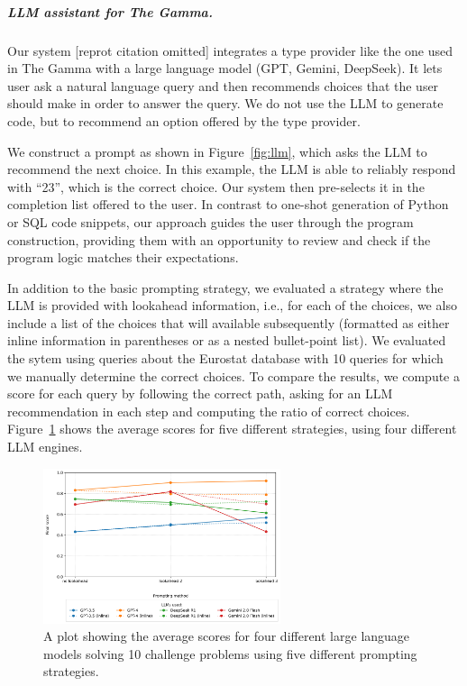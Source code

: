 \documentclass[anonymous, a4paper,UKenglish,cleveref, autoref, thm-restate]{lipics-v2021}
\begin{document}
\subparagraph{LLM assistant for The Gamma.}
Our system [reprot citation omitted] integrates a type provider like the one used in The Gamma
with a large language model (GPT, Gemini, DeepSeek). It lets user ask a natural language query and
then recommends choices that the user should make in order to answer the query. We do not
use the LLM to generate code, but to recommend an option offered by the type provider.

We construct a prompt as shown in Figure~\ref{fig:llm}, which asks the LLM to recommend the next
choice. In this example, the LLM is able to reliably respond with ``23'', which is the correct
choice. Our system then pre-selects it in the completion list offered to the user.
In contrast to one-shot generation of Python or SQL code snippets, our approach guides the user
through the program construction, providing them with an opportunity to review and check if the
program logic matches their expectations.

In addition to the basic prompting strategy, we evaluated a strategy where the LLM
is provided with lookahead information, i.e., for each of the choices, we also include a list of
the choices that will available subsequently (formatted as either inline information in parentheses
or as a nested bullet-point list). We evaluated the sytem using queries about the Eurostat
database with 10 queries for which we manually determine the correct choices. To compare the results,
we compute a score for each query by following the correct path, asking for an LLM recommendation
in each step and computing the ratio of correct choices. Figure~\ref{fig:methods} shows the
average scores for five different strategies, using four different LLM engines.

\begin{figure}[t]
\vspace{-1em}
\includegraphics[width=0.62\textwidth]{fig/llm.png}
\caption{A plot showing the average scores for four different large language models
solving 10 challenge problems using five different prompting strategies.}
\label{fig:methods}
\end{figure}
\end{document}
